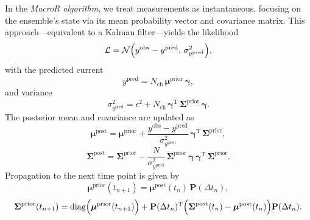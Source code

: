 \documentclass[pdflatex,sn-nature]{sn-jnl}%
\theoremstyle{thmstyleone}%
\theoremstyle{thmstyletwo}%
\theoremstyle{thmstylethree}%
\begin{document}
In the \textit{MacroR algorithm}, we treat measurements as instantaneous, focusing on the ensemble's state via its mean probability vector and covariance matrix. This approach—equivalent to a Kalman filter\cite{stepanyuk2011efficient}—yields the likelihood
\begin{equation}
\mathcal{L} = \mathcal{N}\Bigl( y^{\text{obs}} - y^{\text{pred}},\, \sigma^2_{y^{\text{pred}}} \Bigr),
\label{eq:macro_likelihood}
\end{equation}
with the predicted current
	\begin{equation}
	y^{\text{pred}} = N_{\text{ch}}\, \boldsymbol{\mu}^{\text{prior}}\, \boldsymbol{\gamma},
\label{eq:macro_predicted_y}
\end{equation}
and variance
\begin{equation}
\sigma^2_{y^{\text{pred}}} = \epsilon^2 + N_{\text{ch}}\, \boldsymbol{\gamma}^{\mathrm{T}}\, \boldsymbol{\Sigma}^{\text{prior}}\, \boldsymbol{\gamma}.
	\label{eq:macro_sigma_pred}
	\end{equation}
The posterior mean and covariance are updated as
\begin{equation}
\boldsymbol{\mu}^{\text{post}} = \boldsymbol{\mu}^{\text{prior}} + \frac{y^{\text{obs}} - y^{\text{pred}}}{\sigma^2_{y^{\text{pred}}}}\, \boldsymbol{\gamma}^{\mathrm{T}}\, \boldsymbol{\Sigma}^{\text{prior}},
\label{eq:macro_mean_posterior}
\end{equation}
	\begin{equation}
	\boldsymbol{\Sigma}^{\text{post}} = \boldsymbol{\Sigma}^{\text{prior}} - \frac{N}{\sigma^2_{y^{\text{pred}}}}\, \boldsymbol{\Sigma}^{\text{prior}}\, \boldsymbol{\gamma}\, \boldsymbol{\gamma}^{\mathrm{T}}\, \boldsymbol{\Sigma}^{\text{prior}}.
\label{eq:macro_cov_posterior}
\end{equation}
Propagation to the next time point is given by
\begin{equation}
\boldsymbol{\mu}^{\text{prior}}(t_{n+1}) = \boldsymbol{\mu}^{\text{post}}(t_n)\, \mathbf{P}(\Delta t_n),
	\label{eq:macro_mean_next_prior}
	\end{equation}
\begin{equation}
\boldsymbol{\Sigma}^{\text{prior}}(t_{n+1}) = \mathrm{diag}\Bigl(\boldsymbol{\mu}^{\text{prior}}(t_{n+1})\Bigr) + \mathbf{P}(\Delta t_n)^{\mathrm{T}} \Bigl( \boldsymbol{\Sigma}^{\text{post}}(t_n) - \boldsymbol{\mu}^{\text{post}}(t_n) \Bigr) \mathbf{P}(\Delta t_n).
\label{eq:macro_mean_next_cov}
\end{equation}
\end{document}
